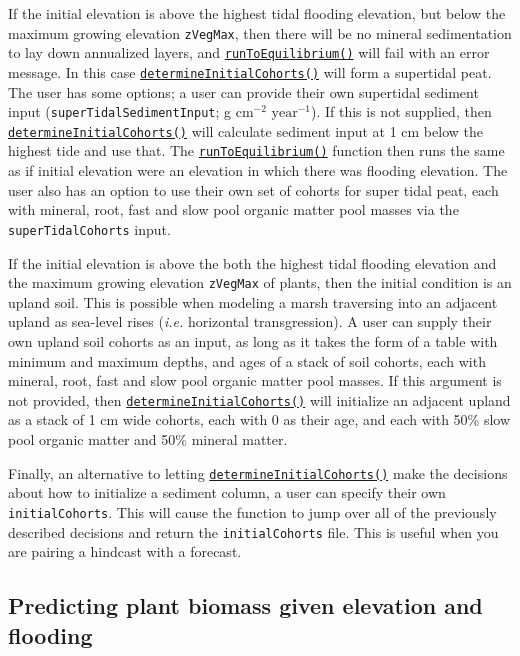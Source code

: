 If the initial elevation is above the highest tidal flooding elevation,
but below the maximum growing elevation \texttt{zVegMax}, then there
will be no mineral sedimentation to lay down annualized layers, and
\protect\hyperlink{runtoequilibrium}{\texttt{runToEquilibrium()}} will
fail with an error message. In this case
\protect\hyperlink{determineinitialcohorts}{\texttt{determineInitialCohorts()}}
will form a supertidal peat. The user has some options; a user can
provide their own supertidal sediment input
(\texttt{superTidalSedimentInput}; g \(\text{cm}^{-2}\)
\(\text{year}^{-1}\)). If this is not supplied, then
\protect\hyperlink{determineinitialcohorts}{\texttt{determineInitialCohorts()}}
will calculate sediment input at 1 cm below the highest tide and use
that. The
\protect\hyperlink{runtoequilibrium}{\texttt{runToEquilibrium()}}
function then runs the same as if initial elevation were an elevation in
which there was flooding elevation. The user also has an option to use
their own set of cohorts for super tidal peat, each with mineral, root,
fast and slow pool organic matter pool masses via the
\texttt{superTidalCohorts} input.

If the initial elevation is above the both the highest tidal flooding
elevation and the maximum growing elevation \texttt{zVegMax} of plants,
then the initial condition is an upland soil. This is possible when
modeling a marsh traversing into an adjacent upland as sea-level rises
(\emph{i.e.} horizontal transgression). A user can supply their own
upland soil cohorts as an input, as long as it takes the form of a table
with minimum and maximum depths, and ages of a stack of soil cohorts,
each with mineral, root, fast and slow pool organic matter pool masses.
If this argument is not provided, then
\protect\hyperlink{determineinitialcohorts}{\texttt{determineInitialCohorts()}}
will initialize an adjacent upland as a stack of 1 cm wide cohorts, each
with 0 as their age, and each with 50\% slow pool organic matter and
50\% mineral matter.

Finally, an alternative to letting
\protect\hyperlink{determineinitialcohorts}{\texttt{determineInitialCohorts()}}
make the decisions about how to initialize a sediment column, a user can
specify their own \texttt{initialCohorts}. This will cause the function
to jump over all of the previously described decisions and return the
\texttt{initialCohorts} file. This is useful when you are pairing a
hindcast with a forecast.

\hypertarget{predicting-plant-biomass-given-elevation-and-flooding}{%
\subsection{Predicting plant biomass given elevation and
flooding}\label{predicting-plant-biomass-given-elevation-and-flooding}}

